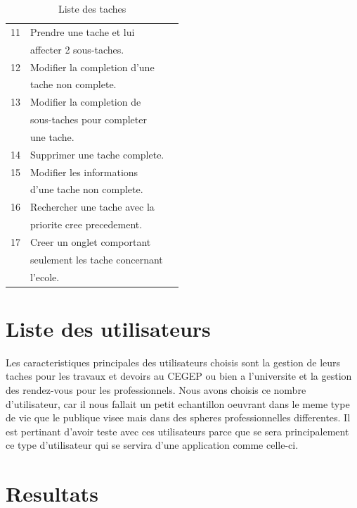 \documentclass[letterpaper, oneside, 12pt, these, creativecommons]{thETS}
\begin{document}
\begin{table}
\begin{tabular}{|l|l|l|}
		11		& Prendre une tache et lui		&							\\
				& affecter 2 sous-taches.		&							\\ \hline
		12		& Modifier la completion d'une	&							\\
				& tache non complete.		&							\\ \hline
		13		& Modifier la completion de	&							\\
				& sous-taches pour completer	&							\\ 
				& une tache.				&							\\ \hline
		14		& Supprimer une tache complete.	&							\\ \hline
		15		& Modifier les informations		&							\\
				& d'une tache non complete.	&							\\ \hline
		16		& Rechercher une tache avec la 	&							\\
				& priorite cree precedement.	& 							\\ \hline
		17		& Creer un onglet comportant	&							\\
				& seulement les tache concernant &							\\
				& l'ecole.				&							\\ \hline
	\end{tabular}
	\caption{Liste des taches}
\end{table}

\section{Liste des utilisateurs}

Les caracteristiques principales des utilisateurs choisis sont la gestion de leurs taches pour les travaux et devoirs au CEGEP ou bien a l'universite et la gestion des rendez-vous pour les professionnels. Nous avons choisis ce nombre d'utilisateur, car il nous fallait un petit echantillon oeuvrant dans le meme type de vie que le publique visee mais dans des spheres professionnelles differentes. Il est pertinant d'avoir teste avec ces utilisateurs parce que se sera principalement ce type d'utilisateur qui se servira d'une application comme celle-ci.

\newpage

\section{Resultats}
\end{document}
